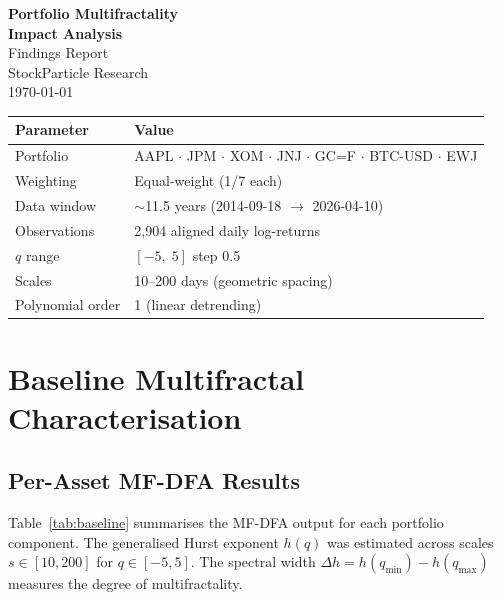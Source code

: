\documentclass[11pt,a4paper]{article}
\begin{document}
\begin{titlepage}
\centering
\vspace*{3cm}
{\Huge\bfseries\color{accent} Portfolio Multifractality\\[0.3em] Impact Analysis}\\[1.5cm]
{\Large Findings Report}\\[2cm]
{\large StockParticle Research}\\[1cm]
{\large\today}\\[3cm]

\begin{tabular}{ll}
\toprule
\textbf{Parameter} & \textbf{Value} \\
\midrule
Portfolio & AAPL $\cdot$ JPM $\cdot$ XOM $\cdot$ JNJ $\cdot$ GC=F $\cdot$ BTC-USD $\cdot$ EWJ \\
Weighting & Equal-weight (1/7 each) \\
Data window & $\sim$11.5 years (2014-09-18 $\to$ 2026-04-10) \\
Observations & 2{,}904 aligned daily log-returns \\
$q$ range & $[-5,\; 5]$ step 0.5 \\
Scales & 10--200 days (geometric spacing) \\
Polynomial order & 1 (linear detrending) \\
\bottomrule
\end{tabular}
\end{titlepage}

\tableofcontents
\newpage

\section{Baseline Multifractal Characterisation}

\subsection{Per-Asset MF-DFA Results}

Table~\ref{tab:baseline} summarises the MF-DFA output for each portfolio component. The generalised Hurst exponent $h(q)$ was estimated across scales $s \in [10, 200]$ for $q \in [-5, 5]$. The spectral width $\Delta h = h(q_{\min}) - h(q_{\max})$ measures the degree of multifractality.
\end{document}
